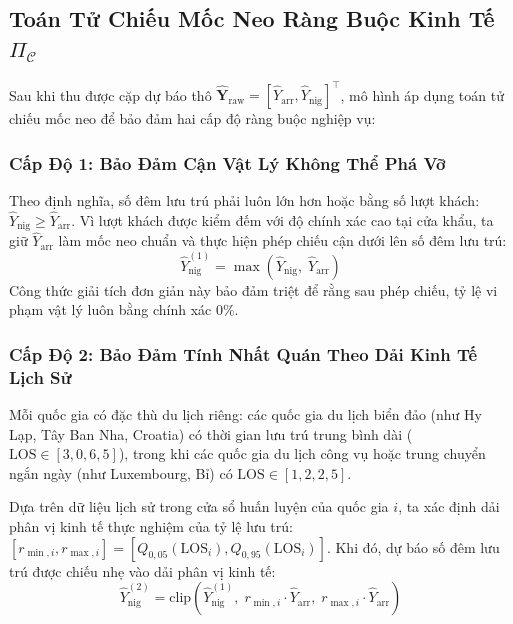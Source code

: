 \subsection{Toán Tử Chiếu Mốc Neo Ràng Buộc Kinh Tế $\Pi_{\mathcal{C}}$}
\label{subsec:projection_operator}
Sau khi thu được cặp dự báo thô $\hat{\mathbf{Y}}_{\text{raw}} = [\hat{Y}_{\text{arr}}, \hat{Y}_{\text{nig}}]^\top$, mô hình áp dụng toán tử chiếu mốc neo để bảo đảm hai cấp độ ràng buộc nghiệp vụ:

\subsubsection{Cấp Độ 1: Bảo Đảm Cận Vật Lý Không Thể Phá Vỡ}
Theo định nghĩa, số đêm lưu trú phải luôn lớn hơn hoặc bằng số lượt khách: $\hat{Y}_{\text{nig}} \ge \hat{Y}_{\text{arr}}$. Vì lượt khách được kiểm đếm với độ chính xác cao tại cửa khẩu, ta giữ $\hat{Y}_{\text{arr}}$ làm mốc neo chuẩn và thực hiện phép chiếu cận dưới lên số đêm lưu trú:
\begin{equation}
    \hat{Y}_{\text{nig}}^{(1)} = \max\left( \hat{Y}_{\text{nig}}, \; \hat{Y}_{\text{arr}} \right)
\end{equation}
Công thức giải tích đơn giản này bảo đảm triệt để rằng sau phép chiếu, tỷ lệ vi phạm vật lý luôn bằng chính xác $0\%$.

\subsubsection{Cấp Độ 2: Bảo Đảm Tính Nhất Quán Theo Dải Kinh Tế Lịch Sử}
Mỗi quốc gia có đặc thù du lịch riêng: các quốc gia du lịch biển đảo (như Hy Lạp, Tây Ban Nha, Croatia) có thời gian lưu trú trung bình dài ($\text{LOS} \in [3{,}0, 6{,}5]$), trong khi các quốc gia du lịch công vụ hoặc trung chuyển ngắn ngày (như Luxembourg, Bỉ) có $\text{LOS} \in [1{,}2, 2{,}5]$.

Dựa trên dữ liệu lịch sử trong cửa sổ huấn luyện của quốc gia $i$, ta xác định dải phân vị kinh tế thực nghiệm của tỷ lệ lưu trú: $[r_{\min, i}, r_{\max, i}] = [Q_{0{,}05}(\text{LOS}_i), Q_{0{,}95}(\text{LOS}_i)]$. Khi đó, dự báo số đêm lưu trú được chiếu nhẹ vào dải phân vị kinh tế:
\begin{equation}
    \hat{Y}_{\text{nig}}^{(2)} = \text{clip}\left( \hat{Y}_{\text{nig}}^{(1)}, \; r_{\min, i} \cdot \hat{Y}_{\text{arr}}, \; r_{\max, i} \cdot \hat{Y}_{\text{arr}} \right)
\end{equation}

